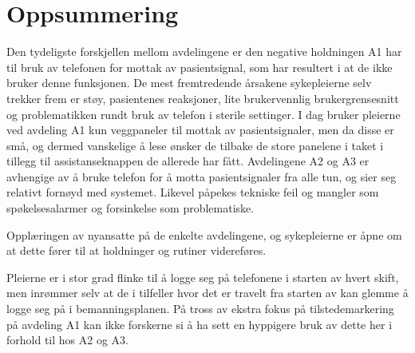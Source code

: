\section{Oppsummering}
Den tydeligste forskjellen mellom avdelingene er den negative holdningen A1 har til bruk av telefonen for mottak av pasientsignal, som har resultert i at de ikke bruker denne funksjonen. De mest fremtredende årsakene sykepleierne selv trekker frem er støy, pasientenes reaksjoner, lite brukervennlig brukergrensesnitt og problematikken rundt bruk av telefon i sterile settinger. I dag bruker pleierne ved avdeling A1 kun veggpaneler til mottak av pasientsignaler, men da disse er små, og dermed vanskelige å lese ønsker de tilbake de store panelene i taket i tillegg til assistanseknappen de allerede har fått. Avdelingene A2 og A3 er avhengige av å bruke telefon for å motta pasientsignaler fra alle tun, og sier seg relativt fornøyd med systemet. Likevel påpekes tekniske feil og mangler som spøkelsesalarmer og forsinkelse som problematiske. 

\noindent
Opplæringen av nyansatte på de enkelte avdelingene, og sykepleierne er åpne om at dette  fører til at holdninger og rutiner videreføres.

\noindent
Pleierne er i stor grad flinke til å logge seg på telefonene i starten av hvert skift, men inrømmer selv at de i tilfeller hvor det er travelt fra starten av kan glemme å logge seg på i bemanningsplanen.
På tross av ekstra fokus på tilstedemarkering på avdeling A1 kan ikke forskerne si å ha sett en hyppigere bruk av dette her i forhold til hos A2 og A3. 


